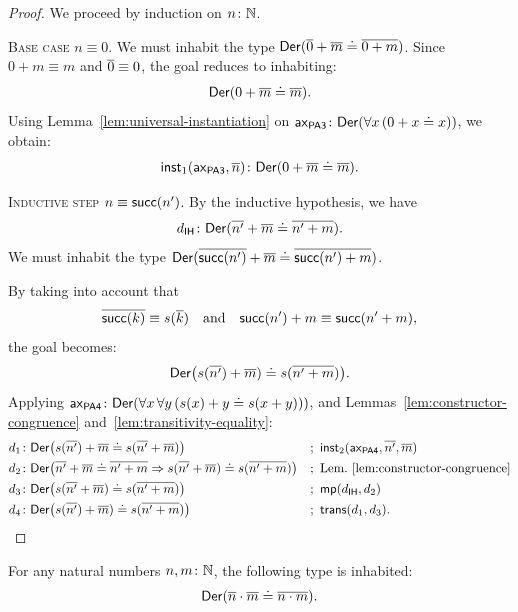\begin{proof}
    We proceed by induction on $n\colon\N$.
    
    \textsc{Base case} $n\equiv0$. We must inhabit the type $\mathsf{Der}({\overline{0}}+{\overline{m}}\doteq {\overline{0+m}})$. Since $0+m\equiv m$ and ${\overline{0}}\equiv0$, the goal reduces to inhabiting:
    \[
        \mathsf{Der}(0+{\overline{m}}\doteq{\overline{m}}).
    \]
    Using Lemma~\ref{lem:universal-instantiation} on $\fun{ax}_{\fun{PA3}}\colon\fun{Der}(\forall x\,(0+x\doteq x))$, we obtain:
    \[
        \fun{inst}_1(\fun{ax}_{\fun{PA3}},\num{n})\colon
            \fun{Der}(0+\num m\doteq\num m).
    \]
    
    \textsc{Inductive step} $n\equiv\mathsf{succ}(n')$. By the inductive hypothesis, we have
    \[
        d_{\fun{IH}}\colon\fun{Der}(\num{n'}+\num m
            \doteq\num{n'+m}).
    \]
    We must inhabit the type $\mathsf{Der}({\overline{\mathsf{succ}(n')}}+{\overline{m}}\doteq{\overline{\mathsf{succ}(n')+m}})$.
    
    By taking into account that
    \[
        {\overline{\mathsf{succ}(k)}}\equiv s({\overline{k}})
        \quad\text{and}\quad
        \mathsf{succ}(n')+m\equiv\mathsf{succ}(n'+m),
    \]
    the goal becomes:
    \[
        \mathsf{Der}\bigl(
            s({\overline{n'}})+{\overline{m}})\doteq s({\overline{n'+m}}
        )\bigr).
    \]
    Applying $\fun{ax}_{\fun{PA4}}\colon\fun{Der}(\forall x\,\forall y\,(s(x)+y\doteq s(x+y)))$, and Lemmas~\ref{lem:constructor-congruence} and~\ref{lem:transitivity-equality}:
    \begin{align*}
        d_1&\colon\fun{Der}\bigl(
            s(\num{n'})+\num m\doteq s(\num{n'}+\num m)
        \bigr)
            &&;\ \fun{inst}_2(\fun{ax}_{\fun{PA4}}, \num{n'}, \num m)\\
        d_2&\colon\fun{Der}\bigl(
            \num{n'}+\num m\doteq\num{n'+m}
            \imp
            s(\num{n'}+\num m)\doteq s(\num{n'+m})
        \bigr)
            &&;\ \text{Lem.~\ref{lem:constructor-congruence}}\\
        d_3&\colon\fun{Der}\bigl(
            s(\num{n'}+\num m)\doteq s(\num{n'+m})
        \bigr)
            &&;\ \fun{mp}(d_{\fun{IH}}, d_2)\\
        d_4&\colon\fun{Der}\bigl(
            s(\num{n'})+\num m)\doteq s(\num{n'+m})
        \bigr)
            &&;\ \fun{trans}(d_1,d_3).
    \end{align*}
\end{proof}

\begin{lem}
    \label{lem:numeral-multiplication}
    For any natural numbers\/ $n,m\colon\N$, the following type is inhabited:
    \[
        \mathsf{Der}({\overline{n}} \cdot {\overline{m}} \doteq {\overline{n \cdot m}}).
    \]
\end{lem}

